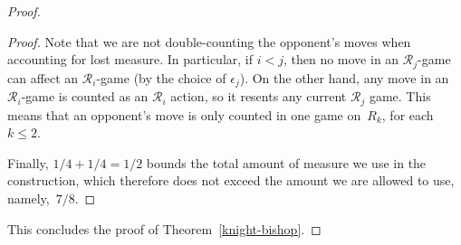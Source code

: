 \documentclass{LMCS}
\newcommand{\0}{\mathbf{0}}
\newcommand{\<}{\langle}
\renewcommand{\>}{\rangle}
\begin{document}
\begin{proof}
\begin{proof}
Note that we are not double-counting the opponent's moves when accounting for
lost measure. In particular, if $i<j$, then no move in an
$\mathcal{R}_j$-game can affect an $\mathcal{R}_i$-game (by the choice of
$\epsilon_j$). On the other hand, any move in an $\mathcal{R}_i$-game is
counted as an $\mathcal{R}_i$ action, so it resents any current
$\mathcal{R}_j$ game. This means that an opponent's move is only counted in
one game on~$R_k$, for each $k\leq 2$.

Finally, $1/4+1/4=1/2$ bounds the total amount of measure we use in
the construction, which therefore does not exceed the amount we are
allowed to use, namely,~$7/8$.
\end{proof}

This concludes the proof of Theorem~\ref{knight-bishop}.
\end{proof}
\end{document}
